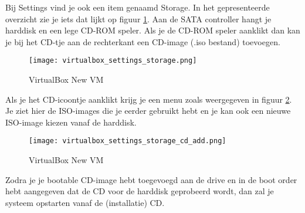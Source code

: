 Bij Settings vind je ook een item genaamd Storage. In het gepresenteerde overzicht zie je iets dat lijkt op figuur \ref{VB_settings_storage}. Aan de SATA controller hangt je harddisk en een lege CD-ROM speler. Als je de CD-ROM speler aanklikt dan kan je bij het CD-tje aan de rechterkant een CD-image (.iso bestand) toevoegen.
\begin{figure}[H]
	\centering
	\texttt{[image: virtualbox\_settings\_storage.png]}
	\caption{VirtualBox New VM}
	\label{VB_settings_storage}
\end{figure}

Als je het CD-icoontje aanklikt krijg je een menu zoals weergegeven in figuur \ref{VB_settings_storage_cd_add}. Je ziet hier de ISO-images die je eerder gebruikt hebt en je kan ook een nieuwe ISO-image kiezen vanaf de harddisk.
\begin{figure}[H]
	\centering
	\texttt{[image: virtualbox\_settings\_storage\_cd\_add.png]}
	\caption{VirtualBox New VM}
	\label{VB_settings_storage_cd_add}
\end{figure}

Zodra je je bootable CD-image hebt toegevoegd aan de drive en in de boot order hebt aangegeven dat de CD voor de harddisk geprobeerd wordt, dan zal je systeem opstarten vanaf de (installatie) CD.

